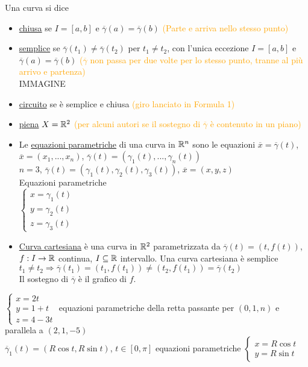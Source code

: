 Una curva si dice
\begin{itemize}
	\item \underline{chiusa} se $I = [a,b]$ e $\overline{\gamma}(a)=\overline{\gamma}(b)$ \textcolor{orange}{(Parte e arriva nello stesso punto)}
	\item \underline{semplice} se $\overline{\gamma}(t_1)\neq \overline{\gamma}(t_2)$ per $t_1 \neq t_2$, con l'unica eccezione $I =[a,b]$ e $\overline{\gamma}(a)=\overline{\gamma}(b)$ \textcolor{orange}{($\overline{\gamma}$ non passa per due volte per lo stesso punto, tranne al più arrivo e partenza)}\\
	IMMAGINE
	\item \underline{circuito} se è semplice e chiusa \textcolor{orange}{(giro lanciato in Formula 1)}
	\item \underline{piena} $X =\mathbb{R}^2$ \textcolor{orange}{(per alcuni autori se il sostegno di $\overline{\gamma}$ è contenuto in un piano)}
\end{itemize}
\begin{itemize}
	\item Le \underline{equazioni parametriche} di una curva in $\mathbb{R}^n$ sono le equazioni $\overline{x}=\overline{\gamma}(t)$, $\overline{x}=(x_1,...,x_n)$, $\overline{\gamma}(t)=(\gamma_1(t),...,\gamma_n(t))$\\
	$n=3$, $\overline{\gamma}(t)=(\gamma_1(t),\gamma_2(t),\gamma_3 (t))$, $\overline{x}=(x,y,z)$\\
	Equazioni parametriche\\
	$\begin{cases}
		x=\gamma_1(t)\\
		y=\gamma_2(t)\\
		z=\gamma_3(t)
	\end{cases}$
	\item \underline{Curva cartesiana} è una curva in $\mathbb{R}^2$ parametrizzata da $\overline{\gamma}(t)=(t,f(t))$, $f:I \rightarrow \mathbb{R}$ continua, $I \subseteq \mathbb{R}$ intervallo. Una curva cartesiana è semplice\\
	$t_1 \neq t_2 \Rightarrow \overline{\gamma}(t_1)=(t_1,f(t_1))\neq (t_2,f(t_1))=\overline{\gamma}(t_2)$\\
	Il sostegno di $\overline{\gamma}$ è il grafico di $f$.
\end{itemize}


\begin{exbar}
		$\begin{cases}
		x=2t\\
		y=1+t\\
		z=4-3t
	\end{cases}$
	equazioni parametriche della retta passante per $(0,1,n)$ e parallela a $(2,1,-5)$\\
	$\overline{\gamma}_1(t)=(R\cos t, R \sin t)$, $t \in [0,\pi]$ equazioni parametriche $\begin{cases}
		x=R \cos t\\
		y=R \sin t
	\end{cases}$
\end{exbar}


